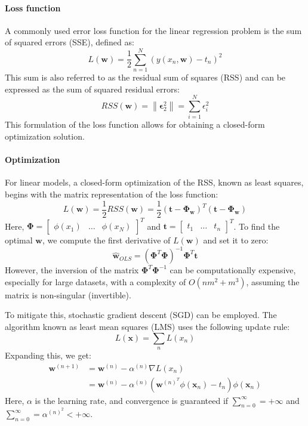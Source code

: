 \paragraph*{Loss function}
A commonly used error loss function for the linear regression problem is the sum of squared errors (SSE), defined as:
\[L(\textbf{w})=\dfrac{1}{2}\sum_{n=1}^{N}\left( y(x_n, \textbf{w})-t_n \right)^2\]
This sum is also referred to as the residual sum of squares (RSS) and can be expressed as the sum of squared residual errors:
\[RSS(\textbf{w})=\left\lVert \boldsymbol{\epsilon}^2_2 \right\rVert = \sum_{i=1}^{N}\epsilon^2_i \]
This formulation of the loss function allows for obtaining a closed-form optimization solution.

\paragraph*{Optimization}
For linear models, a closed-form optimization of the RSS, known as least squares, begins with the matrix representation of the loss function:
\[L(\textbf{w})=\dfrac{1}{2}RSS(\textbf{w})=\dfrac{1}{2}\left( \textbf{t}-\boldsymbol{\Phi}_{\textbf{w}} \right)^T\left( \textbf{t}-\boldsymbol{\Phi}_{\textbf{w}} \right)\]
Here, $\boldsymbol{\Phi}=\begin{bmatrix} \phi(x_1) & \dots & \phi(x_N)\end{bmatrix}^T$ and $\textbf{t}=\begin{bmatrix}t_1 & \dots & t_n\end{bmatrix}^T$.
To find the optimal $\textbf{w}$, we compute the first derivative of $L(\textbf{w})$ and set it to zero:
\[\hat{\textbf{w}}_{OLS}=\left( \boldsymbol{\Phi}^T\boldsymbol{\Phi}\right)^{-1}\boldsymbol{\Phi}^T\textbf{t}\]
However, the inversion of the matrix $\boldsymbol{\Phi}^T\boldsymbol{\Phi}^{-1}$ can be computationally expensive, especially for large datasets, with a complexity of $O(nm^2+m^3)$, assuming the matrix is non-singular (invertible). 

To mitigate this, stochastic gradient descent (SGD) can be employed. 
The algorithm known as least mean squares (LMS) uses the following update rule:
\[L(\textbf{x})=\sum_nL(x_n)\]
Expanding this, we get:
\begin{align*}
    \textbf{w}^{(n+1)}  &= \textbf{w}^{(n)}-\alpha^{(n)}\nabla L(x_n) \\
                        &= \textbf{w}^{(n)}-\alpha^{(n)}\left( \textbf{w}^{(n)^T}\phi(\textbf{x}_n)-t_n \right)\phi(\textbf{x}_n)
\end{align*}
Here, $\alpha$ is the learning rate, and convergence is guaranteed if $\sum_{n=0}^{\infty}=+\infty$ and $\sum_{n=0}^{\infty}=\alpha^{(n)^2}<+\infty$.

